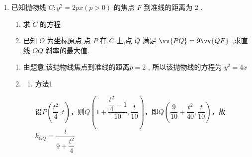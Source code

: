\begin{enumerate}
\begin{jieda}
\begin{enumerate}
            由 $\left\{  \begin{array}{l} y = k\left( {x - 1}\right) \\  {y}^{2} = {4x} \end{array}\right.$ ,得 ${k}^{2}{x}^{2} - \left( {2{k}^{2} + 4}\right) x + {k}^{2} = 0$，根据韦达定理有$\left\{\begin{array}{l}
                 {x}_{1} + {x}_{2} = 2 + \dfrac{4}{{k}^{2}}  \\
                 {x}_{1}{x}_{2} = 1
            \end{array}\right.$ 根据两直线垂直可知两直线斜率乘积为$-1$，则可得 $\left\{\begin{array}{l}
                 {x}_{3} + {x}_{4} = 2 + 4k^2  \\
                 {x}_{3}{x}_{4} = 1
            \end{array}\right.$
            
            故$\vv{AD} \cdot  \vv{EB} = 1 + \left( {2 + \dfrac{4}{{k}^{2}}}\right)  + 1 + 1 + \left( {2 + 4{k}^{2}}\right)  + 1 = 8 + 4\left( {{k}^{2} + \dfrac{1}{{k}^{2}}}\right)  \geq  8 + 4 \times  2\sqrt{{k}^{2} \cdot  \dfrac{1}{{k}^{2}}} = {16}
            $
            
            当且仅当 ${k}^{2} = \dfrac{1}{{k}^{2}}$ 即 $k =  \pm  1$ 时, $\vv{AD} \cdot  \vv{EB}$ 取最小值 16.
        \end{enumerate}
    \end{jieda}

    \item 已知抛物线 $C : {y}^{2} = {2px}\left( {p > 0}\right)$ 的焦点 $F$ 到准线的距离为 2 .
    \begin{enumerate}
        \item 求 $C$ 的方程
        \item 已知 $O$ 为坐标原点,点 $P$ 在 $C$ 上,点 $Q$ 满足 $\vv{PQ} = 9\vv{QF}$ ,求直线 ${OQ}$ 斜率的最大值.
    \end{enumerate}
    \begin{jieda}
        \begin{enumerate}
            \item 由题意,该抛物线焦点到准线的距离$p = 2$ , 所以该抛物线的方程为 ${y}^{2} = {4x}$
            \item 
            \begin{enumerate}
                \item 方法1
                
                设$P\left(\dfrac{t^2}{4}, t\right)$，则$Q\left(1+\dfrac{\dfrac{t^2}{4}-1}{10}, \dfrac{t}{10}\right)$，即$Q\left(\dfrac{9}{10}+\dfrac{t^2}{40}, \dfrac{t}{10}\right)$，故$k_{OQ} = \dfrac{t}{9+\dfrac{t^2}{4}}$
    

\end{enumerate}
\end{enumerate}
\end{jieda}
\end{enumerate}
